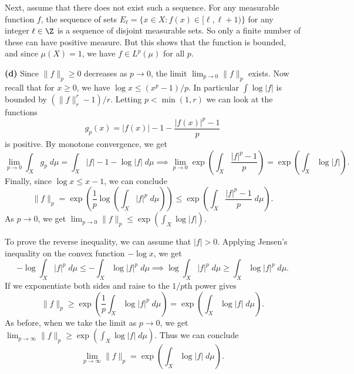 \documentclass[11pt,letterpaper]{article}
\begin{document}
\begin{solution}
    \quad Next, assume that there does not exist such a sequence. For any measurable function $f$, the sequence of sets $E_\ell = \{ x\in X : f(x)\in [\ell, \ell+1) \}$ for any integer $\ell\in \Z$ is a sequence of disjoint measurable sets. So only a finite number of these can have positive measure. But this shows that the function is bounded, and since $\mu(X)=1$, we have $f\in L^p(\mu)$ for all $p$.

    \textbf{(d)} Since $\|f\|_p\geq 0$ decreases as $p\to 0$, the limit $\lim_{p\to 0}\|f\|_p$ exists. Now recall that for $x\geq 0$, we have $\log x \leq (x^p - 1) / p$. In particular $\int \log |f|$ is bounded by $(\|f\|_r^r - 1) / r$. Letting $p < \min(1,r)$ we can look at the functions
    \[
        g_p(x) = |f(x)|-1-\frac{|f(x)|^p-1}{p}
    \]
    is positive. By monotone convergence, we get
    \[
        \lim_{p\to 0}\int_X g_p\;d\mu = \int_X |f| - 1 - \log |f|\;d\mu \implies \lim_{p\to 0}\exp\left(\int_X \frac{|f|^p-1}{p}\right)=\exp\left(\int_X \log |f|\right)
    .\]  
    Finally, since $\log x \leq x - 1$, we can conclude
    \[
        \|f\|_p = \exp\left(\frac{1}{p}\log \left(\int_X |f|^p\;d\mu\right)\right)\leq \exp\left(\int_X \frac{|f|^p-1}{p}\;d\mu\right)
    .\] 
    As $p\to 0$, we get $\lim_{p\to 0}\|f\|_p \leq \exp(\int_X \log |f|)$.

    \quad To prove the reverse inequality, we can assume that $|f|>0$. Applying Jensen's inequality on the convex function $-\log x$, we get
    \[
        -\log \int_X |f|^p\;d\mu \leq -\int_X \log |f|^p\;d\mu \implies \log \int_X |f|^p\;d\mu \geq \int_X \log |f|^p\;d\mu
    .\] 
    If we exponentiate both sides and raise to the $1 /p$th power gives
    \[
        \|f\|_p \geq \exp\left(\frac{1}{p}\int_X \log |f|^p\;d\mu\right)=\exp(\int_X \log |f|\;d\mu)
    .\] 
    As before, when we take the limit as $p\to 0$, we get $\lim_{p\to \infty}\|f\|_p \geq \exp(\int_X \log |f|\;d\mu)$. Thus we can conclude
    \[
        \lim_{p\to \infty}\|f\|_p = \exp\left(\int_X \log |f|\;d\mu\right)
    .\] 

\end{solution}
\end{document}
